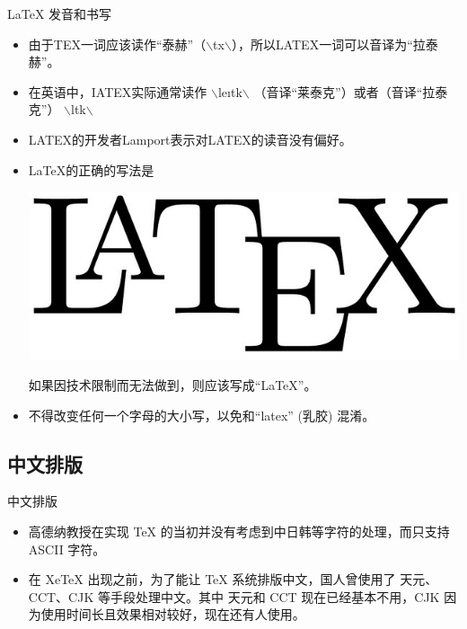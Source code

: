 \documentclass[13pt]{ctexbeamer}
\begin{document}
\begin{frame}{LaTeX 发音和书写}
	\begin{itemize}
\item 	由于TEX一词应该读作“泰赫”（$\backslash$t\textepsilon x$\backslash$），所以LATEX一词可以音译为“拉泰赫”。
\item 
	在英语中，IATEX实际通常读作
$\backslash$le\i t\textepsilon k$\backslash$
（音译“莱泰克”）或者（音译“拉泰克”）
$\backslash$l\textscripta\textlengthmark t\textepsilon k$\backslash$
\item 
	LATEX的开发者Lamport表示对LATEX的读音没有偏好。
		\end{itemize}
	\vspace{15pt}
		\begin{itemize}
\item 
LaTeX的正确的写法是
\begin{center}
\includegraphics[scale=0.08]{LATEX.jpg}
\end{center}
如果因技术限制而无法做到，则应该写成“LaTeX”。
\item 
不得改变任何一个字母的大小写，以免和“latex” (乳胶) 混淆。
	\end{itemize}

	
	

	
	

\end{frame}
\subsection{中文排版}


\begin{frame}{中文排版}
\begin{itemize}
    \item 高德纳教授在实现 TeX 的当初并没有考虑到中日韩等字符的处理，而只支持 ASCII 字符。
    \item 在 XeTeX 出现之前，为了能让 TeX 系统排版中文，国人曾使用了 天元、CCT、CJK 等手段处理中文。其中 天元和 CCT 现在已经基本不用，CJK 因为使用时间长且效果相对较好，现在还有人使用。

    \end{itemize}
\end{frame}
    
\end{document}
